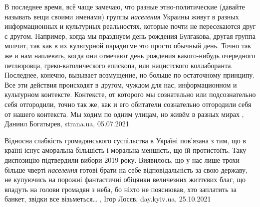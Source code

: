 В последнее время, всё чаще замечаю, что разные этно-политические (давайте
называть вещи своими именами) группы \emph{населения} Украины живут в разных
информационных и культурных реальностях, которые почти не пересекаются друг с
другом. Например, когда мы празднуем день рождения Булгакова, другая группа
молчит, так как в их культурной парадигме это просто обычный день. Точно так же
и нам наплевать, когда они отмечают день рождения какого-нибудь очередного
петлюровца, греко-католического епископа, или нацистского коллаборанта.
Последнее, конечно, вызывает возмущение, но больше по остаточному принципу. Все
эти действия происходят в другом, чуждом для нас, информационном и культурном
контексте. Контексте, от которого мы сознательно или подсознательно себя
отгородили, точно так же, как и его обитатели сознательно отгородили себя от
нашего контекста. Мы ходим по одним улицам, но живём в разных мирах
, 
Даниил Богатырев, strana.ua, 05.07.2021

Відносна слабкість громадянського суспільства в Україні пов’язана з тим, що в
країні існує аморальна більшість і моральна меншість, що їй протистоїть. Таку
диспозицію підтвердили вибори 2019 року. Виявилось, що у нас лише трохи більше
чверті \emph{населення} готові брати на себе відповідальність за свою державу, не
купуючись на порожні фантастичні обіцянки величезних життєвих благ, що впадуть
на голови громадян з неба, бо ніхто не пояснював, хто заплатить за банкет,
звідки все візьметься…
, 
Ігор Лосєв, day.kyiv.ua, 25.10.2021
